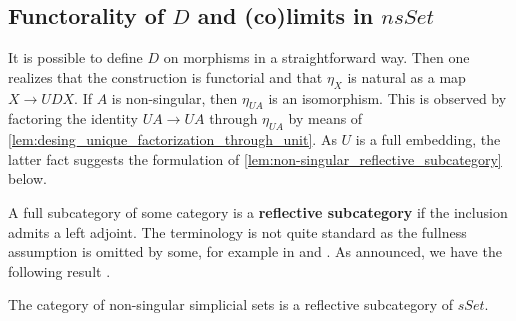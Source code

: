 \subsection{Functorality of $D$ and (co)limits in $nsSet$}

It is possible to define $D$ on morphisms in a straightforward way. Then one realizes that the construction is functorial and that $\eta _X$ is natural as a map $X\to UDX$. If $A$ is non-singular, then $\eta _{UA}$ is an isomorphism. This is observed by factoring the identity $UA\to UA$ through $\eta _{UA}$ by means of \cref{lem:desing_unique_factorization_through_unit}. As $U$ is a full embedding, the latter fact suggests the formulation of \cref{lem:non-singular_reflective_subcategory} below.

A full subcategory of some category is a \textbf{reflective subcategory} if the inclusion admits a left adjoint. The terminology is not quite standard as the fullness assumption is omitted by some, for example in \cite[§IV.3]{ML98} and \cite[p.~1306]{AR15}. As announced, we have the following result \cite[Rem.~2.2.12]{WJR13}.
\begin{lemma}\label{lem:non-singular_reflective_subcategory}
The category of non-singular simplicial sets is a reflective subcategory of $sSet$.
\end{lemma}
